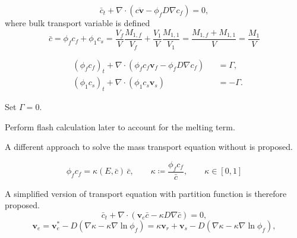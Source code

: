 \documentclass[usenames,dvipsnames,letterpaper,landscape,final]{slides}
\def\grad{\nabla}
\renewcommand\div{\nabla\cdot}
\def\grad{\nabla}
\def\div{\nabla\cdot}
\def\v{\mathbf{v}}
\begin{document}

\begin{myslideNoFooter}
		  \begin{equation*}
    \bar{c}_t + \div (\overline{c\v} - \phi_f D \grad c_f)=0,
\end{equation*}
where bulk transport variable is defined
\begin{equation*}
	\bar{c} = \phi_f c_f + \phi_1 c_s
	= \frac{V_f}{V}\frac{M_{1,f}}{V_f} + \frac{V_1}{V}\frac{M_{1,1}}{V_1}
	= \frac{M_{1,f} + M_{1,1}}{V}
	= \frac{M_1}{V}
\end{equation*}

\bigskip
{}
\begin{equation*}
\begin{aligned}
	&(\phi_f c_f)_t + \div (\phi_f c_f \v_f - \phi_f D \grad c_f)
	    &&= \Gamma,\\
	&(\phi_1 c_s)_t + \div (\phi_1 c_s \v_s) &&= -\Gamma.
\end{aligned}
\end{equation*}

\bigskip
{}\begin{blist}
\item Set $\Gamma = 0$.
\item Perform flash calculation later to account for the melting term.
\end{blist}

\end{myslideNoFooter}
\begin{myslideNoFooter}
A different approach to solve the mass transport equation 
without  is proposed.

\begin{equation*}
	\phi_f c_f = \kappa(E,\bar{c})\,\bar{c},\qquad
    \kappa \coloneqq \frac{\phi_f c_f}{\bar{c}}, \qquad
    \kappa \in [0,1]
\end{equation*}

A simplified version of transport equation with partition function is 
therefore proposed.
\begin{equation*}
	\bar{c}_t + \div (\v_e \bar{c} - \kappa D \grad \bar{c}) = 0,
\end{equation*}
\begin{equation*}
	 \v_e = \v_e^* - D (\grad \kappa - \kappa \grad \ln\phi_f)
	 = \kappa\v_r + \v_s - D(\grad\kappa - \kappa\grad \ln\phi_f),
\end{equation*}

\end{myslideNoFooter}
\end{document}

